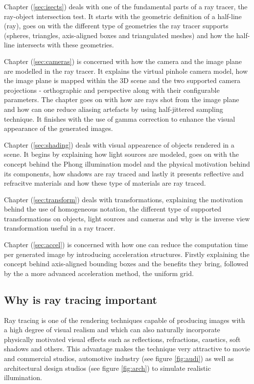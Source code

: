 \documentclass{article}
\begin{document}
Chapter (\ref{sec:isects}) deals with one of the fundamental parts of a ray tracer, the ray-object intersection test. It starts with the geometric definition of a half-line (ray), goes on with the different type of geometries the ray tracer supports (spheres, triangles, axis-aligned boxes and triangulated meshes) and how the half-line intersects with these geometries.

\vspace*{\baselineskip}

Chapter (\ref{sec:cameras}) is concerned with how the camera and the image plane are modelled in the ray tracer. It explains the virtual pinhole camera model, how the image plane is mapped within the 3D scene and the two supported camera projections - orthographic and perspective along with their configurable parameters. The chapter goes on with how are rays shot from the image plane and how can one reduce aliasing artefacts by using half-jittered sampling technique. It finishes with the use of gamma correction to enhance the visual appearance of the generated images. 

\vspace*{\baselineskip}

Chapter (\ref{sec:shading}) deals with visual appearence of objects rendered in a scene. It begins by explaining how light sources are modeled, goes on with the concept behind the Phong illumination model and the physical motivation behind its components, how shadows are ray traced and lastly it presents reflective and refracitve materials and how these type of materials are ray traced.

\vspace*{\baselineskip}

Chapter (\ref{sec:transform}) deals with transformations, explaining the motivation behind the use of homogeneous notation, the different type of supported transformations on objects, light sources and cameras and why is the inverse view transformation useful in a ray tracer.

\vspace*{\baselineskip}

Chapter (\ref{sec:accel}) is concerned with how one can reduce the computation time per generated image by introducing acceleration structures. Firstly explaining the concept behind axis-aligned bounding boxes and the benefits they bring, followed by the a more advanced acceleration method, the uniform grid.

\subsection{Why is ray tracing important}
Ray tracing is one of the rendering techniques capable of producing images with a high degree of visual realism and which can also naturally incorporate physically motivated visual effects such as reflections, refractions, caustics, soft shadows and others. This advantage makes the technique very attractive to movie and commercial studios, automotive industry (see figure \ref{fig:audi}) as well as architectural design studios (see figure \ref{fig:arch}) to simulate realistic illumination.  
\end{document}
